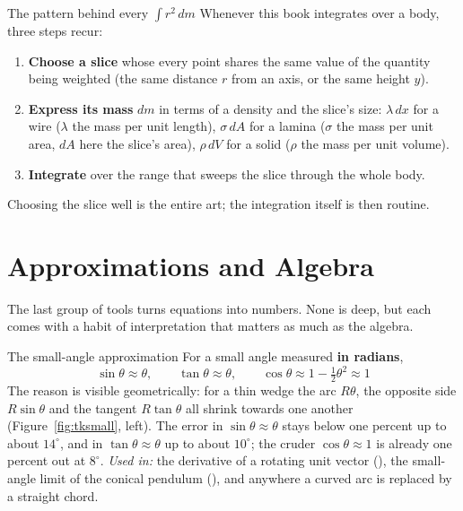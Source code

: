 \begin{methodbox}{The pattern behind every $\int r^2\,dm$}
Whenever this book integrates over a body, three steps recur:
\begin{enumerate}
\item \textbf{Choose a slice} whose every point shares the same value of the quantity being weighted
      (the same distance $r$ from an axis, or the same height $y$).
\item \textbf{Express its mass} $dm$ in terms of a density and the slice's size: $\lambda\,dx$ for a
      wire ($\lambda$ the mass per unit length), $\sigma\,dA$ for a lamina ($\sigma$ the mass per unit
      area, $dA$ here the slice's area), $\rho\,dV$ for a solid ($\rho$ the mass per unit volume).
\item \textbf{Integrate} over the range that sweeps the slice through the whole body.
\end{enumerate}
Choosing the slice well is the entire art; the integration itself is then routine.
\end{methodbox}

\section{Approximations and Algebra}

The last group of tools turns equations into numbers. None is deep, but each comes with a habit of
interpretation that matters as much as the algebra.

\begin{defbox}{The small-angle approximation}
For a small angle measured \textbf{in radians},
\[
\boxed{\;\sin\theta\approx\theta,\qquad \tan\theta\approx\theta,\qquad \cos\theta\approx1-\tfrac12\theta^{2}\approx1\;}
\]
The reason is visible geometrically: for a thin wedge the arc $R\theta$, the opposite side $R\sin\theta$
and the tangent $R\tan\theta$ all shrink towards one another (Figure~\ref{fig:tksmall}, left). The error in $\sin\theta\approx\theta$
stays below one percent up to about $14^\circ$, and in $\tan\theta\approx\theta$ up to about $10^\circ$;
the cruder $\cos\theta\approx1$ is already one percent out at $8^\circ$.
\emph{Used in:} the derivative of a rotating unit vector (), the small-angle limit of
the conical pendulum (), and anywhere a curved arc is replaced by a straight chord.
\end{defbox}

\begin{figure}[htbp]
\centering
{}
\end{figure}

